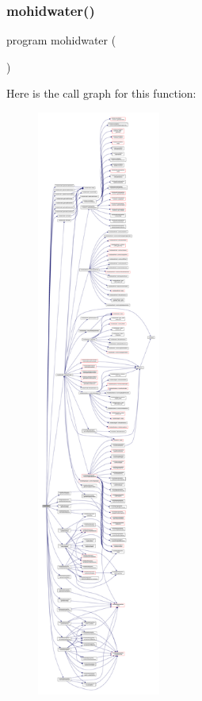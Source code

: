 \subsubsection{\texorpdfstring{mohidwater()}{mohidwater()}}
{\footnotesize\ttfamily program mohidwater (\begin{DoxyParamCaption}{ }\end{DoxyParamCaption})}

Here is the call graph for this function\+:\nopagebreak
\begin{figure}[H]
\begin{center}
\leavevmode
\includegraphics[height=550pt]{_main_8_f90_a22cacab418d9e36dcaa8c3aef44b4185_cgraph}
\end{center}
\end{figure}
\mbox{\label{_main_8_f90_a27516f33f4d1cea85cbc73fd9de518e6}} 
